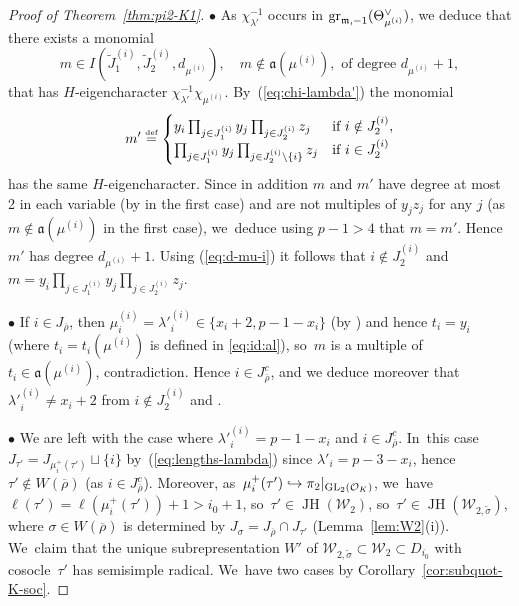 \documentclass[JEP,XML,SOM,Unicode,NoFloatCountersInSection, NoEqCountersInSection,published]{cedram}
\newcommand\hto{\mathrel{\lhook\joinrel\to}}
\newcommand{\sbullet}{{\scriptscriptstyle\bullet}}
\let\wt\widetilde
\newcommand{\defeq}{\stackrel{\textrm{\tiny{\upshape{def}}}}{=}}
\newcommand{\cO}{\mathcal{O}}
\newcommand{\cW}{\mathcal{W}}
\newcommand{\brho}{\overline{\rho}}
\DeclareMathOperator{\GL}{GL}
\DeclareMathOperator{\gr}{gr}
\DeclareMathOperator{\JH}{\mathrm{JH}}
\theoremstyle{plain}
\theoremstyle{definition}
\begin{document}
\begin{proof}[Proof of Theorem~\ref{thm:pi2-K1}]
$\sbullet$ As $\chi_{\lambda'}^{-1}$ occurs in $\gr_{\m,-1}(\Theta_{\mu^{(i)}}^\vee)$, we deduce that there exists a monomial
\[
m \in I(\wt J_1^{(i)},\wt J_2^{(i)},d_{\mu^{(i)}}),\quad m \notin \mathfrak{a}(\mu^{(i)}),\text{ of degree }d_{\mu^{(i)}}+1,
\]
that has $H$-eigencharacter $\chi_{\lambda'}^{-1}\chi_{\mu^{(i)}}$.
By~(\ref{eq:chi-lambda'}) the monomial
\begin{equation*}
m' \defeq
\begin{cases}
y_{i} \prod_{j \in J_1^{(i)}} y_j \prod_{j \in J_2^{(i)}} z_j & \text{if $i \notin J_2^{(i)}$},\\
\prod_{j \in J_1^{(i)}} y_j \prod_{j \in J_2^{(i)} \setminus \{i\}} z_j & \text{if $i \in J_2^{(i)}$}
\end{cases}
\end{equation*}
has the same $H$-eigencharacter.
Since in addition $m$ and $m'$ have degree at most 2 in each variable (by \cite[Def.\,4.2.4]{BHHMS4}
in the first case) and are not multiples of $y_jz_j$ for any $j$ (as $m \notin \mathfrak{a}(\mu^{(i)})$ in the first case), we~deduce using $p-1 > 4$ that $m = m'$.
Hence $m'$ has degree $d_{\mu^{(i)}}+1$.
Using (\ref{eq:d-mu-i}) it follows that $i \notin J_2^{(i)}$ and $m = y_{i} \prod_{j \in J_1^{(i)}} y_j \prod_{j \in J_2^{(i)}} z_j$.

$\sbullet$ If $i \in J_{\brho}$, then $\mu^{(i)}_{i} = \lambda'^{(i)}_{i} \in \{x_{i}+2,p-1-x_{i}\}$
(by \cite[Eq.\,(60), eq.~(61)]{BHHMS4}) and hence $t_{i} = y_{i}$ (where $t_i = t_i(\mu^{(i)})$ is defined in \eqref{eq:id:al}), so~$m$ is a multiple of $t_i \in \mathfrak{a}(\mu^{(i)})$, contradiction.
Hence $i \in J_{\brho}^c$, and we deduce moreover that $\lambda'^{(i)}_{i} \ne x_{i}+2$ from $i \notin J_2^{(i)}$ and \cite[Eq.\,(60)]{BHHMS4}.

$\sbullet$ We are left with the case where $\lambda'^{(i)}_{i} = p-1-x_{i}$ and $i \in J_{\brho}^c$. In~this case
$J_{\tau'} = J_{\mu_i^+(\tau')} \sqcup \{i\}$
by~(\ref{eq:lengths-lambda}) since $\lambda'_i=p-3-x_i$, hence $\tau' \notin W(\brho)$ (as $i \in J_{\brho}^c$).
Moreover, as~$\mu_i^+(\tau') \hto \pi_2|_{\GL_2(\cO_K)}$, we~have $\ell(\tau') = \ell(\mu_i^+(\tau'))+1 > i_0+1$, so~$\tau' \in \JH(\cW_2)$, so~$\tau' \in \JH(\cW_{2,\wt\sigma})$, where $\sigma \in W(\brho)$ is determined by $J_\sigma = J_{\brho} \cap J_{\tau'}$ (Lemma~\ref{lem:W2}(i)). We~claim that the unique subrepresentation $W'$ of $\cW_{2,\wt\sigma} \subset \cW_2 \subset D_{i_0}$ with cosocle~$\tau'$ has semisimple radical. We~have two cases by Corollary~\ref{cor:subquot-K-soc}.


\end{proof}
\end{document}

